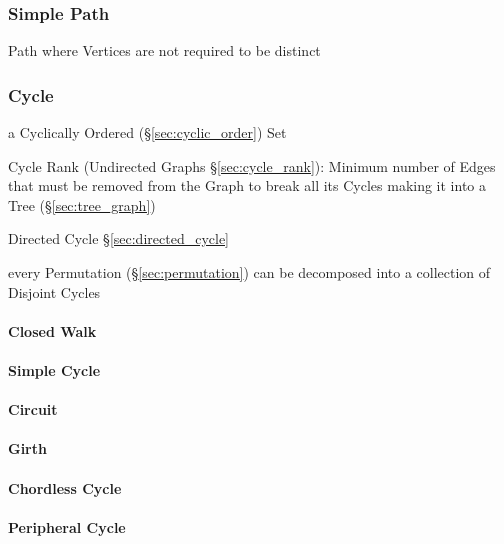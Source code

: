 \subsubsection{Simple Path}\label{sec:simple_path}

Path where Vertices are not required to be distinct



\subsubsection{Cycle}\label{sec:cycle}

a Cyclically Ordered (\S\ref{sec:cyclic_order}) Set

\fist Cycle Rank (Undirected Graphs \S\ref{sec:cycle_rank}): Minimum number of
Edges that must be removed from the Graph to break all its Cycles making it
into a Tree (\S\ref{sec:tree_graph})

Directed Cycle \S\ref{sec:directed_cycle}

every Permutation (\S\ref{sec:permutation}) can be decomposed into a collection
of Disjoint Cycles



\paragraph{Closed Walk}\label{sec:closed_walk}\hfill

\paragraph{Simple Cycle}\label{sec:simple_cycle}\hfill

\paragraph{Circuit}\label{sec:circuit}\hfill

\paragraph{Girth}\label{sec:girth}\hfill

\paragraph{Chordless Cycle}\label{sec:chordless_cycle}\hfill

\paragraph{Peripheral Cycle}\label{sec:peripheral_cycle}\hfill

